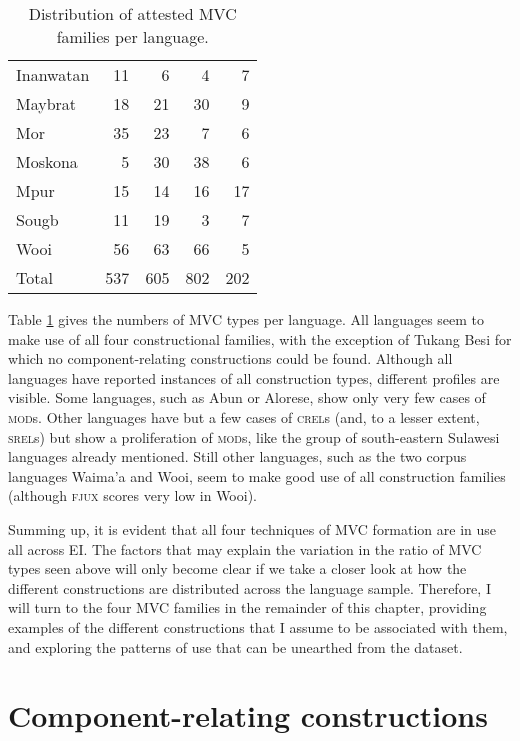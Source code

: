 \begin{table}
\begin{tabular}{lrrrr}
  Inanwatan &  11 &   6 &   4  &   7  \\ 
  Maybrat &  18 &  21 &  30  &   9  \\ 
  Mor &  35 &  23 &   7  &   6  \\ 
  Moskona &   5 &  30 &  38  &   6  \\ 
  Mpur &  15 &  14 &  16  &  17  \\ 
  Sougb &   11 &  19 &   3  &   7 \\ 
  Wooi &  56 &  63 &  66  &   5  \\ 
   \hline
   Total & 537 & 605 & 802 & 202 \\
   \hline
\end{tabular}
\caption[Distribution of attested MVC families per language]{Distribution of attested MVC families per language.}
\label{table:MVCperlang}


\end{table}


Table \ref{table:MVCperlang} gives the numbers of MVC types per language. All languages seem to make use of all four constructional families, with the exception of Tukang Besi for which no component-relating constructions could be found. Although all languages have reported instances of all construction types, different profiles are visible. Some languages, such as Abun or Alorese, show only very few cases of \textsc{mod}s. Other languages have but a few cases of \textsc{crel}s (and, to a lesser extent, \textsc{srel}s) but show a proliferation of \textsc{mod}s, like the group of south-eastern Sulawesi languages already mentioned. Still other languages, such as the two corpus languages Waima'a and Wooi, seem to make good use of all construction families (although \textsc{fjux} scores very low in Wooi). 

Summing up, it is evident that all four techniques of MVC formation are in use all across EI. The factors that may explain the variation in the ratio of MVC types seen above will only become clear if we take a closer look at how the different constructions are distributed across the language sample. Therefore, I will turn to the four MVC families in the remainder of this chapter, providing examples of the different constructions that I assume to be associated with them, and exploring the patterns of use that can be unearthed from the dataset.

\section{Component-relating constructions}

